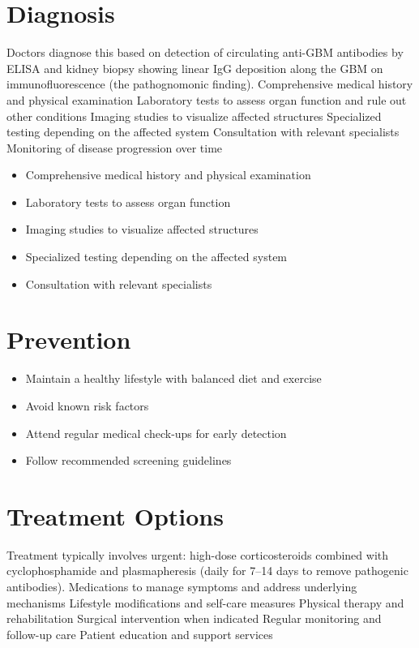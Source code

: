 \section{Diagnosis}
Doctors diagnose this based on detection of circulating anti-GBM antibodies by ELISA and kidney biopsy showing linear IgG deposition along the GBM on immunofluorescence (the pathognomonic finding). Comprehensive medical history and physical examination Laboratory tests to assess organ function and rule out other conditions Imaging studies to visualize affected structures Specialized testing depending on the affected system Consultation with relevant specialists Monitoring of disease progression over time

\begin{itemize}[noitemsep]
  \item Comprehensive medical history and physical examination
  \item Laboratory tests to assess organ function
  \item Imaging studies to visualize affected structures
  \item Specialized testing depending on the affected system
  \item Consultation with relevant specialists
\end{itemize}
\section{Prevention}
\begin{itemize}[noitemsep]
  \item Maintain a healthy lifestyle with balanced diet and exercise
  \item Avoid known risk factors
  \item Attend regular medical check-ups for early detection
  \item Follow recommended screening guidelines
\end{itemize}
\section{Treatment Options}
Treatment typically involves urgent: high-dose corticosteroids combined with cyclophosphamide and plasmapheresis (daily for 7--14 days to remove pathogenic antibodies). Medications to manage symptoms and address underlying mechanisms Lifestyle modifications and self-care measures Physical therapy and rehabilitation Surgical intervention when indicated Regular monitoring and follow-up care Patient education and support services

